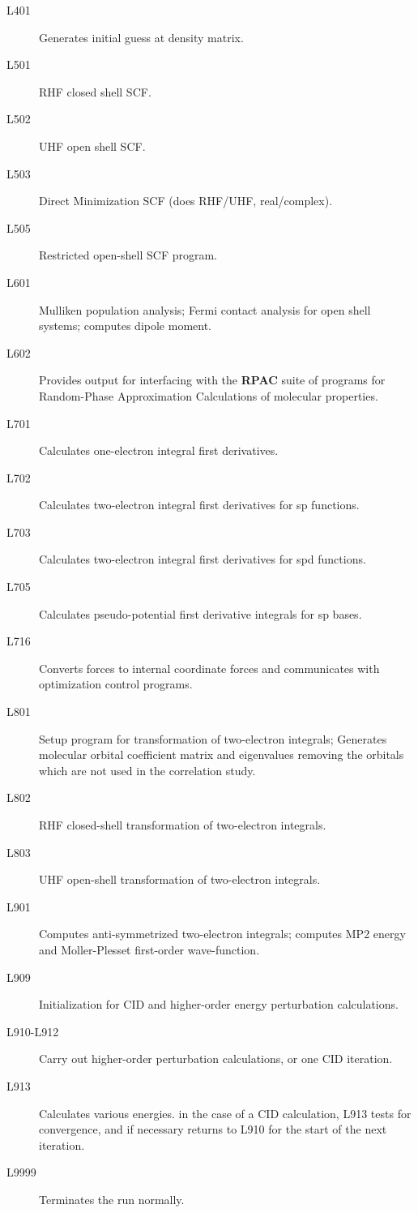 \begin{description}
\item[L401]     Generates initial guess at density matrix.
\item[L501]     RHF closed shell SCF.
\item[L502]     UHF open shell SCF.
\item[L503]     Direct Minimization SCF (does RHF/UHF, real/complex).
\item[L505]     Restricted open-shell SCF program.
\item[L601]     Mulliken population analysis; Fermi contact analysis for open
shell systems; computes dipole moment.
\item[L602]     Provides output for interfacing with the {\bf RPAC}
suite of programs for Random-Phase Approximation Calculations of molecular
properties.
\item[L701]     Calculates one-electron integral first derivatives.
\item[L702]     Calculates two-electron integral first derivatives for sp
functions.
\item[L703]     Calculates two-electron integral first derivatives for spd
functions.
\item[L705]     Calculates pseudo-potential first derivative integrals for sp
bases.
\item[L716]     Converts forces to internal coordinate forces and communicates
with optimization control programs.
\item[L801]     Setup program for transformation of two-electron integrals;
Generates molecular orbital coefficient matrix and eigenvalues
removing the orbitals which are not used in the correlation
study.
\item[L802]     RHF closed-shell transformation of two-electron integrals.
\item[L803]     UHF open-shell transformation of two-electron integrals.
\item[L901]     Computes anti-symmetrized two-electron integrals; computes MP2
energy and Moller-Plesset first-order wave-function.
\item[L909]     Initialization for CID and higher-order energy perturbation
calculations.
\item[L910-L912] Carry out higher-order perturbation calculations, or one CID
iteration.
\item[L913]     Calculates various energies. in the case of a CID calculation,
L913 tests for convergence, and if necessary returns to L910
for the start of the next iteration.
\item[L9999]    Terminates the run normally.
\end{description}
